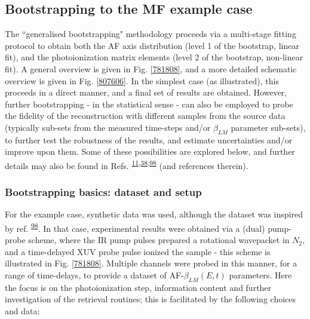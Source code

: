 \documentclass[10pt]{article}
\begin{document}
\subsection{Bootstrapping to the MF example case\label{sec:bootstrapping}}


The ``generalised bootstrapping" methodology proceeds via a multi-stage fitting protocol to obtain both the AF axis distribution (level 1 of the bootstrap, linear fit), and the photoionization matrix elements (level 2 of the bootstrap, non-linear fit). A general overview is given in Fig. \ref{781808}, and a more detailed schematic overview is given in Fig. \ref{807606}. In the simplest case (as illustrated), this proceeds in a direct manner, and a final set of results are obtained. However, further bootstrapping - in the statistical sense - can also be employed to probe the fidelity of the reconstruction with different samples from the source data (typically sub-sets from the measured time-steps and/or $\beta_{LM}$ parameter sub-sets), to further test the robustness of the results, and estimate uncertainties and/or improve upon them. Some of these possibilities are explored below, and further details may also be found in Refs. \textsuperscript{\hyperref[csl:11]{11},\hyperref[csl:38]{38},\hyperref[csl:98]{98}} (and references therein).






\subsubsection{Bootstrapping basics: dataset and setup}

For the example case, synthetic data was used, although the dataset was inspired by ref. \textsuperscript{\hyperref[csl:98]{98}}. In that case, experimental results were obtained via a (dual) pump-probe scheme, where the IR pump pulses prepared a rotational wavepacket in $N_2$, and a time-delayed XUV probe pulse ionized the sample - this scheme is illustrated in Fig. \ref{781808}. Multiple channels were probed in this manner, for a range of time-delays, to provide a dataset of AF-$\beta_{LM}(E,t)$ parameters. Here the focus is on the photoionization step, information content and further investigation of the retrieval routines; this is facilitated by the following choices and data:
\end{document}
